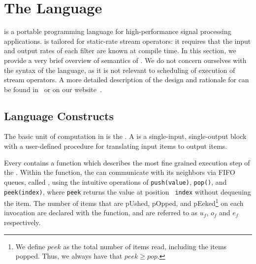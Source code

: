 \section{The {\StreamIt} Language}
\label{sec:streamit}

{\StreamIt} is a portable programming language for
high-performance signal processing applications.  {\StreamIt} is
tailored for static-rate stream operators: it requires that the
input and output rates of each filter are known at compile time.
In this section, we provide a very brief overview of
semantics of {\StreamIt}.  We do not concern ourselves with the
syntax of the language, as it is not relevant to scheduling of
execution of stream operators. A more detailed description of the
design and rationale for {\StreamIt} can be found
in~\cite{thies02streamit} or on our website~\cite{streamitweb}.

\subsection{Language Constructs}

The basic unit of computation in {\StreamIt} is the {\filter}. A
{\filter} is a single-input, single-output block with a user-defined
procedure for translating input items to output items.
\begin{comment}
An example of a filter is the {\tt FIRFilter}, a component of our
software radio (see Figure \ref{fig:radiocode}). Each filter
contains an {\tt init} function that is called at initialization
time; in this case, the {\tt FIRFilter} calculates {\tt weights},
which represents its impulse response.
\end{comment}
Every {\filter} contains a {\work} function which describes the
most fine grained execution step of the {\filter}. Within the
{\work} function, the {\filter} can communicate with its neighbors
via FIFO queues, called {\Channels}, using the intuitive
operations of {\tt push(value)}, {\tt pop()}, and {\tt
peek(index)}, where {\tt peek} returns the value at position {\tt
index} without dequeuing the item.  The number of items that are
pUshed, pOpped, and pEeked\footnote{We define $peek$ as the total
number of items read, including the items popped.  Thus, we always
have that $peek \ge pop$.} on each invocation are declared with
the {\work} function, and are referred to as $u_f$, $o_f$ and
$e_f$ respectively.



